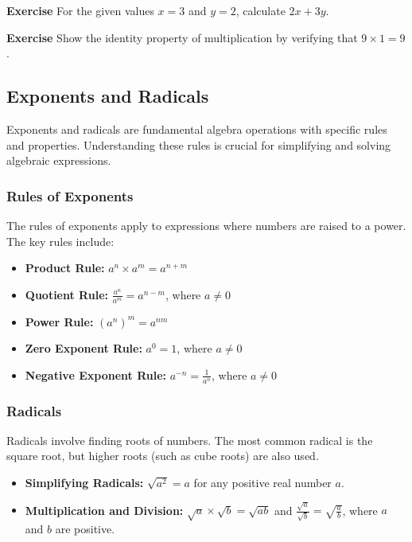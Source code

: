 \documentclass[a4paper,12pt]{book}
\newenvironment{exercise}[1][]
  {\par\medskip\noindent\textbf{Exercise #1} \rmfamily}
  {\medskip}
\begin{document}
\begin{exercise}
For the given values \( x = 3 \) and \( y = 2 \), calculate \( 2x + 3y \).
\end{exercise}


\begin{exercise}
Show the identity property of multiplication by verifying that \( 9 \times 1 = 9 \).
\end{exercise}




\subsection{Exponents and Radicals}
\label{subsec:exponents_and_radicals}
Exponents and radicals are fundamental algebra operations with specific rules and properties. Understanding these rules is crucial for simplifying and solving algebraic expressions.


\subsubsection{Rules of Exponents}
The rules of exponents apply to expressions where numbers are raised to a power. The key rules include:
\begin{itemize}
    \item \textbf{Product Rule:} \( a^n \times a^m = a^{n+m} \)
    \item \textbf{Quotient Rule:} \( \frac{a^n}{a^m} = a^{n-m} \), where \( a \neq 0 \)
    \item \textbf{Power Rule:} \( (a^n)^m = a^{nm} \)
    \item \textbf{Zero Exponent Rule:} \( a^0 = 1 \), where \( a \neq 0 \)
    \item \textbf{Negative Exponent Rule:} \( a^{-n} = \frac{1}{a^n} \), where \( a \neq 0 \)
\end{itemize}


\subsubsection{Radicals}
Radicals involve finding roots of numbers. The most common radical is the square root, but higher roots (such as cube roots) are also used.


\begin{itemize}
    \item \textbf{Simplifying Radicals:} \( \sqrt{a^2} = a \) for any positive real number \( a \).
    \item \textbf{Multiplication and Division:} \( \sqrt{a} \times \sqrt{b} = \sqrt{ab} \) and \( \frac{\sqrt{a}}{\sqrt{b}} = \sqrt{\frac{a}{b}} \), where \( a \) and \( b \) are positive.
\end{itemize}
\end{document}
